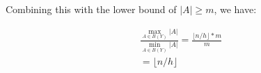 \documentclass[a4paper,BCOR=10mm]{report}
\begin{document}
\begin{appendices}
Combining this with the lower bound of $|A| \geq m$, we have:

\begin{align*}
\frac{\max_{A \in B(Y)} |A|}{\min_{A \in B(Y)} |A|} = \frac{\lfloor n/h \rfloor * m}{m} \\
= \lfloor n/h \rfloor
\end{align*}






\end{appendices}
\end{document}
